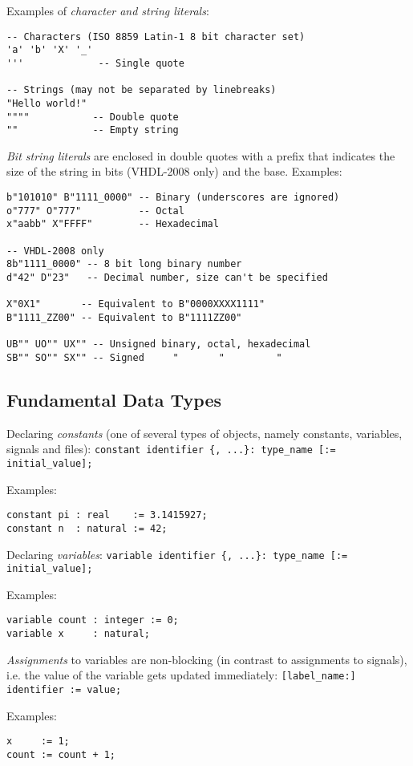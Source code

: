 \documentclass[fontsize=11pt,a4paper]{scrartcl}
\begin{document}
Examples of \emph{character and string literals}:
\begin{lstlisting}
-- Characters (ISO 8859 Latin-1 8 bit character set)
'a' 'b' 'X' '_'
'''             -- Single quote

-- Strings (may not be separated by linebreaks)
"Hello world!"
""""           -- Double quote
""             -- Empty string
\end{lstlisting}

\newpage
\emph{Bit string literals} are enclosed in double quotes with a prefix that indicates the size of the string in bits (\textsc{VHDL-2008} only) and the base. Examples:
\begin{lstlisting}
b"101010" B"1111_0000" -- Binary (underscores are ignored)
o"777" O"777"          -- Octal
x"aabb" X"FFFF"        -- Hexadecimal

-- VHDL-2008 only
8b"1111_0000" -- 8 bit long binary number
d"42" D"23"   -- Decimal number, size can't be specified

X"0X1"       -- Equivalent to B"0000XXXX1111"
B"1111_ZZ00" -- Equivalent to B"1111ZZ00"

UB"" UO"" UX"" -- Unsigned binary, octal, hexadecimal
SB"" SO"" SX"" -- Signed     "       "         "
\end{lstlisting}
%
%
%
%
\subsection{Fundamental Data Types}
Declaring \emph{constants} (one of several types of objects, namely constants, variables, signals and files): \lstinline!constant identifier {, ...}: type_name [:= initial_value];!  

Examples:
\begin{lstlisting}
constant pi : real    := 3.1415927;
constant n  : natural := 42;
\end{lstlisting}

Declaring \emph{variables}: \lstinline!variable identifier {, ...}: type_name [:= initial_value];!

Examples:
\begin{lstlisting}
variable count : integer := 0;
variable x     : natural;
\end{lstlisting}

\emph{Assignments} to variables are non-blocking (in contrast to assignments to signals), i.e. the value of the variable gets updated immediately: \lstinline![label_name:] identifier := value;!

Examples:
\begin{lstlisting}
x     := 1;
count := count + 1;
\end{lstlisting}
\end{document}
